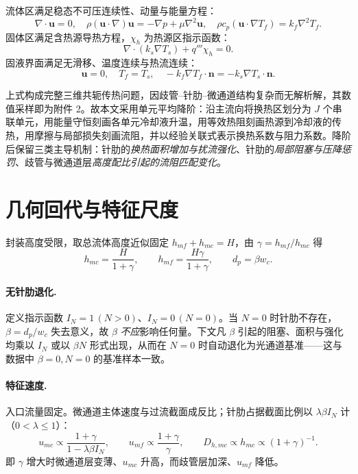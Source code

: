 \documentclass[UTF8,a4paper,12pt]{ctexart}
\numberwithin{equation}{section}
\begin{document}
流体区满足稳态不可压连续性、动量与能量方程：
\begin{equation}
    \nabla\cdot\mathbf u=0,\quad
    \rho(\mathbf u\cdot\nabla)\mathbf u=-\nabla p+\mu\nabla^2\mathbf u,\quad
    \rho c_p(\mathbf u\cdot\nabla T_f)=k_f\nabla^2T_f .
\end{equation}
固体区满足含热源导热方程，$\chi_h$ 为热源区指示函数：
\begin{equation}
    \nabla\cdot(k_s\nabla T_s)+q'''\chi_h=0 .
\end{equation}
固液界面满足无滑移、温度连续与热流连续：
\begin{equation}
    \mathbf u=0,\quad T_f=T_s,\quad -k_f\nabla T_f\cdot\mathbf n=-k_s\nabla T_s\cdot\mathbf n .
\end{equation}

上式构成完整三维共轭传热问题，因歧管--针肋--微通道结构复杂而无解析解，其数值采样即为附件 2。故本文采用单元平均降阶：沿主流向将换热区划分为 $J$ 个串联单元，用能量守恒刻画各单元冷却液升温，用等效热阻刻画热源到冷却液的传热，用摩擦与局部损失刻画流阻，并以经验关联式表示换热系数与阻力系数。降阶后保留三类主导机制：针肋的\emph{换热面积增加与扰流强化}、针肋的\emph{局部阻塞与压降惩罚}、歧管与微通道层\emph{高度配比引起的流阻匹配变化}。

\section{几何回代与特征尺度}

封装高度受限，取总流体高度近似固定 $h_{mf}+h_{mc}=H$，由 $\gamma=h_{mf}/h_{mc}$ 得
\begin{equation}
    h_{mc}=\frac{H}{1+\gamma},\qquad h_{mf}=\frac{H\gamma}{1+\gamma},\qquad d_p=\beta w_c .
    \label{eq:geo}
\end{equation}

\paragraph{无针肋退化.}定义指示函数 $I_N=1\,(N>0)$、$I_N=0\,(N=0)$。当 $N=0$ 时针肋不存在，$\beta=d_p/w_c$ 失去意义，故 $\beta$ \emph{不应}影响任何量。下文凡 $\beta$ 引起的阻塞、面积与强化均乘以 $I_N$ 或以 $\beta N$ 形式出现，从而在 $N=0$ 时自动退化为光通道基准——这与数据中 $\beta=0,N=0$ 的基准样本一致。

\paragraph{特征速度.}入口流量固定。微通道主体速度与过流截面成反比；针肋占据截面比例以 $\lambda\beta I_N$ 计（$0<\lambda\le1$）：
\begin{equation}
    u_{mc}\propto\frac{1+\gamma}{1-\lambda\beta I_N},\qquad
    u_{mf}\propto\frac{1+\gamma}{\gamma},\qquad
    D_{h,mc}\propto h_{mc}\propto(1+\gamma)^{-1}.
    \label{eq:vel}
\end{equation}
即 $\gamma$ 增大时微通道层变薄、$u_{mc}$ 升高，而歧管层加深、$u_{mf}$ 降低。
\end{document}
